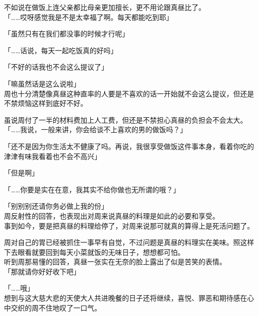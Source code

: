 不如说在做饭上连父亲都比母亲更加擅长，更不用论跟真昼比了。\\

「……哎呀感觉我是不是太幸福了啊。每天都能吃到耶」

「虽然只有在我们都没事的时候才行呢」

「……话说，每天一起吃饭真的好吗」

「不好的话我也不会这么提议了」

「嘛虽然话是这么说啦」\\

周也十分清楚像真昼这种直率的人要是不喜欢的话一开始就不会这么提议，但还是不禁烦恼这样到底好不好。

虽说周付了一半的材料费加上人工费，但还是不禁担心真昼的负担会不会太大。\\

「……我说，一般来讲，你会给谈不上喜欢的男的做饭吗？」

「还不是因为你生活太不健康了吗。再说，我很享受做饭这件事本身，看着你吃的津津有味我看着也不会不高兴」

「但是啊」

「……你要是实在在意，我其实不给你做也无所谓的哦？」

「别别别还请你务必做上我的份」\\

周反射性的回答，也表现出对周来说真昼的料理是如此的必要和享受。\\

事到如今，要是把真昼的料理给停了，对周来说那可就真的算得上是死活问题了。

周对自己的胃已经被抓住一事早有自觉，不过问题是真昼的料理实在美味。照这样下去眼看就要回到每天小菜就饭的无味日子，想想都可怕。\\

听到周那易懂的回答，真昼一张实在无奈的脸上露出了似是苦笑的表情。\\

「那就请你好好收下吧」

「……哦」\\

想到与这大慈大悲的天使大人共进晚餐的日子还将继续，喜悦、罪恶和期待感在心中交织的周不住地叹了一口气。
